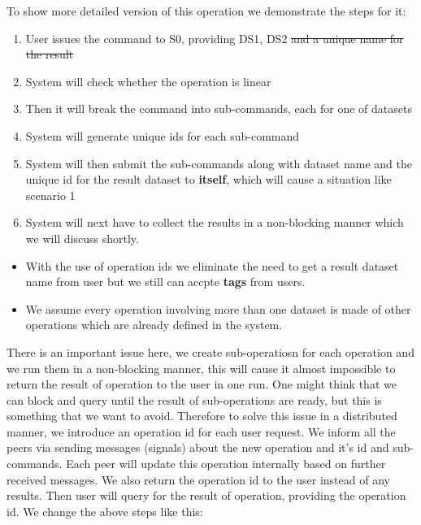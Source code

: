 To show more detailed version of this operation we demonstrate the steps for it:

\begin{enumerate}
\item User issues the command to S0, providing DS1, DS2 \st{and a unique name for the result}
\item System will check whether the operation is linear
\item Then it will break the command into sub-commands, each for one of datasets
\item System will generate unique ids for each sub-command
\item System will then submit the sub-commands along with dataset name and the unique id for the result dataset
to \textbf{itself}, which will cause a situation like scenario 1
\item System will next have to collect the results in a non-blocking manner which we will discuss shortly.
\end{enumerate}

\begin{itemize}
\item With the use of operation ids we eliminate the need to get a result dataset name from user but we still can accpte \textbf{tags} from users.
\end{itemize}

\begin{itemize}
\item We assume every operation involving more than one dataset is made of other operations which are already defined in the system.
\end{itemize}

There is an important issue here, we create sub-operatiosn for each operation and we run them in a non-blocking manner, this will
cause it almost impossible to return the result of operation to the user in one run. One might think that we can block and query
until the result of sub-operations are ready, but this is something that we want to avoid. Therefore to solve this issue in a 
distributed manner, we introduce an operation id for each user request. We inform all the peers via sending messages (signals) about
the new operation and it's id and sub-commands. Each peer will update this operation internally based on further received messages.
We also return the operation id to the user instead of any results. Then user will query for the result of operation, providing the 
operation id. We change the above steps like this:

